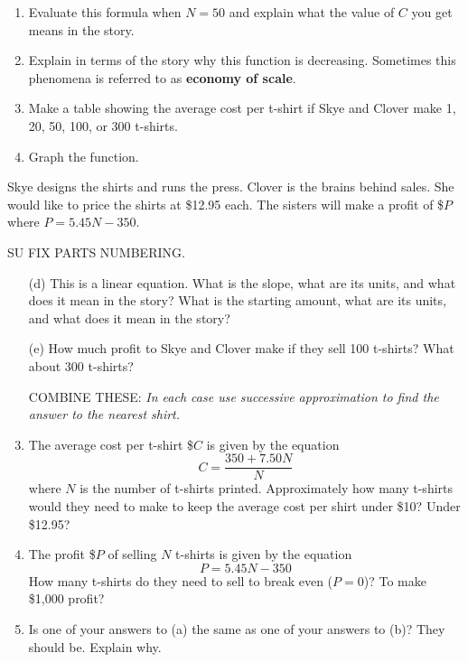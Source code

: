 \documentclass[12pt]{article}
\begin{document}
\begin{enumerate}
\begin{enumerate}
\item Evaluate this formula when $N=50$ and explain what the value of $C$ you get means in the story.
\item Explain in terms of the story why this function is decreasing.  Sometimes this phenomena is referred to as \textbf{economy of scale}.
\item Make a table showing the average cost per t-shirt if Skye and Clover make 1, 20, 50, 100, or 300 t-shirts.
\item Graph the function.
\end{enumerate}
Skye designs the shirts and runs the press.   Clover is the brains behind sales.  She would like to price the shirts at \$12.95 each.  The sisters will make a profit of \$$P$ where $P = 5.45N-350$.  

SU FIX PARTS NUMBERING.
\begin{enumerate}
\item [(d)]This is a linear equation.  What is the slope, what are its units, and what does it mean in the story?  What is the starting amount, what are its units, and what does it mean in the story?
\item [(e)] How much profit to Skye and Clover make if they sell 100 t-shirts?  What about 300 t-shirts?

COMBINE THESE:
  \emph{In each case use successive approximation to find the answer to the nearest shirt.}

\item The average cost per t-shirt \$$C$ is given by the equation $$C = \frac{350+7.50N}{N}$$ where $N$ is the number of t-shirts printed.  Approximately how many t-shirts would they need to make to keep the average cost per shirt under \$10?  Under \$12.95?
\item The profit  \$$P$ of selling $N$ t-shirts is given by the equation $$P = 5.45N-350$$  How many t-shirts do they need to sell to break even ($P=0$)? To make \$1,000 profit?
\item Is one of your answers to (a) the same as one of your answers to (b)?  They should be.  Explain why.
\end{enumerate}



\end{enumerate}
\end{document}

